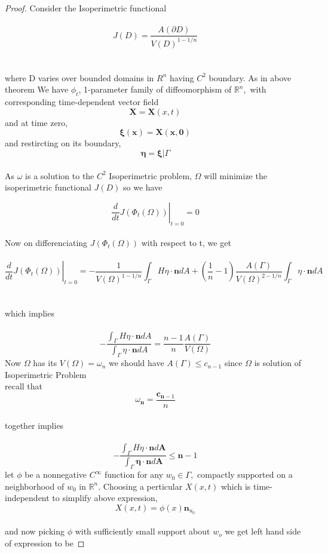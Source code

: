 \documentclass[oneside]{book}
\begin{document}
\begin{proof}

Consider the Isoperimetric functional \\\\
\begin{equation}
\label{eq35}
J(D)=\frac{A(\partial D)}{V(D)^{1-1 / n}}
 \end{equation}
 \\\\
where D varies over bounded domains in $R^{n}$ having $C^{2}$ boundary.
As in above \\ theorem We have $\phi_{t}$, 1-parameter family of diffeomorphism of $\mathbb{R}^{n},$ with corresponding time-dependent vector field $$\boldsymbol{X} = \boldsymbol{X}(x, t)$$ and at time zero,\\ $$\boldsymbol{\xi}(\boldsymbol{x})=\boldsymbol{X}(\boldsymbol{x}, \boldsymbol{0})$$ and  restircting on its boundary,   \\      $$\boldsymbol{\eta}=\boldsymbol{\xi} | \Gamma $$ \\
As $\omega$ is a solution to the  $C^{2}$ Isoperimetric problem, $\Omega$ will minimize the isoperimetric functional $J(D)$ so we have


$$\left.\frac{d}{d t} J\left(\Phi_{t}(\Omega)\right)\right|_{t=0} = 0 $$ \\ 
Now on differenciating $J(\Phi_{t}(\Omega))$ with respect to t,
we get \\\\
$$\left.\frac{d}{d t} J\left(\Phi_{t}(\Omega)\right)\right|_{t=0} =  -\frac{1}{V(\Omega)^{1-1 / n}} \int_{\Gamma} H \eta \cdot \mathbf{n} d A+\left(\frac{1}{n}-1\right) \frac{A(\Gamma)}{V(\Omega)^{2-1 / n}} \int_{\Gamma} \eta \cdot \mathbf{n} d A 
$$ \\\\
which implies \\\\
$$
-\frac{\int_{\Gamma} H \eta \cdot \mathbf{n} d A}{\int_{\Gamma} \eta \cdot \mathbf{n} d A}=\frac{n-1}{n} \frac{A(\Gamma)}{V(\Omega)}
$$
Now $\Omega$ has its $V(\Omega) = \omega_{n}$ we should have $A(\Gamma) \leq c_{n-1}$ since $\Omega $ is solution of Isoperimetric Problem \\
 recall that \\ $$ \omega_{\mathbf{n}}=\frac{\mathbf{c}_{\mathbf{n}-1}}{n}$$ \\
 together  implies \\\\
 \begin{equation}
 \label{eq36}
 -\frac{\int_{\Gamma} H \eta \cdot \mathbf{n} d \boldsymbol{A}}{\int_{\Gamma} \boldsymbol{\eta} \cdot \mathbf{n} d \boldsymbol{A}} \leq \boldsymbol{n}-1 
 \end{equation}
 let $\phi$ be a nonnegative $C^{\infty}$ function for any $w_{0} \in \Gamma,$ compactly supported on a neighborhood of $w_{0}$ in $\mathbb{R}^{n}$.
 Choosing a perticular $X(x, t)$ which is time-independent to  simplify above expression, \\
$$
X(x, t)=\phi(x) \mathbf{n}_{u_{0}}
$$
\\
and now picking $\phi$ with sufficiently small support about $w_{o}$ we get left hand side of expression to be 


\end{proof}
\end{document}
